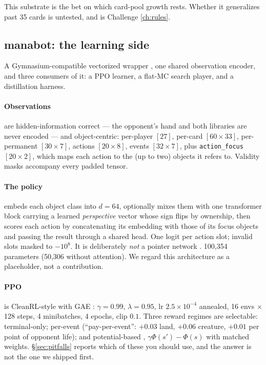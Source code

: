 \documentclass[11pt]{article}
\begin{document}
This substrate is the bet on which card-pool growth rests. Whether it generalizes past 35 cards is untested, and is Challenge \ref{ch:rules}.

\subsection{manabot: the learning side}

A Gymnasium-compatible vectorized wrapper \citep{towers2024gymnasium}, one shared observation encoder, and three consumers of it: a PPO learner, a flat-MC search player, and a distillation harness.

\paragraph{Observations} are hidden-information correct --- the opponent's hand and both libraries are never encoded --- and object-centric: per-player $[27]$, per-card $[60\times33]$, per-permanent $[30\times7]$, actions $[20\times8]$, events $[32\times7]$, plus \texttt{action\_focus} $[20\times2]$, which maps each action to the (up to two) objects it refers to. Validity masks accompany every padded tensor.

\paragraph{The policy} embeds each object class into $d=64$, optionally mixes them with one transformer block \citep{vaswani2017attention} carrying a learned \emph{perspective} vector whose sign flips by ownership, then scores each action by concatenating its embedding with those of its focus objects and passing the result through a shared head. One logit per action slot; invalid slots masked to $-10^8$. It is deliberately \emph{not} a pointer network \citep{vinyals2015pointer}. 100{,}354 parameters (50{,}306 without attention). We regard this architecture as a placeholder, not a contribution.

\paragraph{PPO} is CleanRL-style \citep{huang2022cleanrl,schulman2017ppo} with GAE \citep{schulman2015gae}: $\gamma=0.99$, $\lambda=0.95$, lr $2.5\times10^{-4}$ annealed, 16 envs $\times$ 128 steps, 4 minibatches, 4 epochs, clip $0.1$. Three reward regimes are selectable: terminal-only; per-event (``pay-per-event'': $+0.03$ land, $+0.06$ creature, $+0.01$ per point of opponent life); and potential-based \citep{ng1999shaping}, $\gamma\Phi(s')-\Phi(s)$ with matched weights. \S\ref{sec:pitfalls} reports which of these you should use, and the answer is not the one we shipped first.
\end{document}
